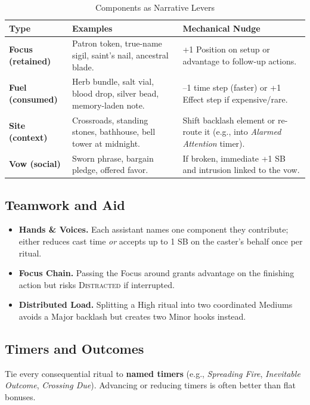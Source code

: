 \begin{longtable}{>{\bfseries}l X X}
\caption{Components as Narrative Levers}\label{tab:ritual_components}\\
\toprule
\textbf{Type} & \textbf{Examples} & \textbf{Mechanical Nudge} \\
\midrule
Focus (retained) & Patron token, true-name sigil, saint's nail, ancestral blade. & +1 Position on setup or advantage to follow-up actions. \\
Fuel (consumed) & Herb bundle, salt vial, blood drop, silver bead, memory-laden note. & --1 time step (faster) or +1 Effect step if expensive/rare. \\
Site (context) & Crossroads, standing stones, bathhouse, bell tower at midnight. & Shift backlash element or re-route it (e.g., into \emph{Alarmed Attention} timer). \\
Vow (social) & Sworn phrase, bargain pledge, offered favor. & If broken, immediate +1 SB and intrusion linked to the vow. \\
\bottomrule
\end{longtable}

\subsection{Teamwork and Aid}\label{subsec:ritual_teamwork}
\begin{itemize}
    \item \textbf{Hands \& Voices.} Each assistant names one component they contribute; either reduces cast time \emph{or} accepts up to 1 SB on the caster's behalf once per ritual.
    \item \textbf{Focus Chain.} Passing the Focus around grants advantage on the finishing action but risks \textsc{Distracted} if interrupted.
    \item \textbf{Distributed Load.} Splitting a High ritual into two coordinated Mediums avoids a Major backlash but creates two Minor hooks instead.
\end{itemize}

\subsection{Timers and Outcomes}\label{subsec:ritual_timers}
Tie every consequential ritual to \textbf{named timers} (e.g., \emph{Spreading Fire}, \emph{Inevitable Outcome}, \emph{Crossing Due}). Advancing or reducing timers is often better than flat bonuses.

